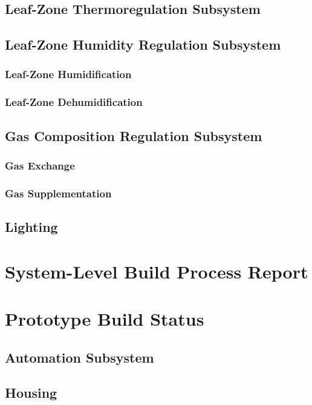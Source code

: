 \documentclass{../tex/report}
\begin{document}
\subsection{Leaf-Zone Thermoregulation Subsystem}
\subsection{Leaf-Zone Humidity Regulation Subsystem}
\subsubsection{Leaf-Zone Humidification}
\subsubsection{Leaf-Zone Dehumidification}
\subsection{Gas Composition Regulation Subsystem}
\subsubsection{Gas Exchange}
\subsubsection{Gas Supplementation}
\subsection{Lighting}



\section{System-Level Build Process Report}



\section{Prototype Build Status}
\subsection{Automation Subsystem}
\subsection{Housing}
\end{document}
